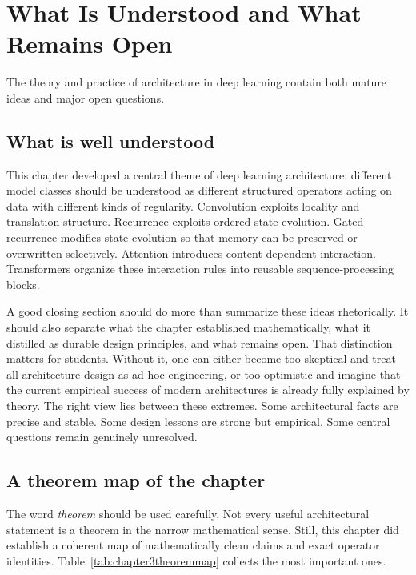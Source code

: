 \section{What Is Understood and What Remains Open}

The theory and practice of architecture in deep learning contain both mature ideas and major open questions.

\subsection*{What is well understood}

This chapter developed a central theme of deep learning architecture:
different model classes should be understood as different structured operators acting on data with different kinds of regularity.
Convolution exploits locality and translation structure.
Recurrence exploits ordered state evolution.
Gated recurrence modifies state evolution so that memory can be preserved or overwritten selectively.
Attention introduces content-dependent interaction.
Transformers organize these interaction rules into reusable sequence-processing blocks.

\medskip

A good closing section should do more than summarize these ideas rhetorically.
It should also separate what the chapter established mathematically, what it distilled as durable design principles, and what remains open.
That distinction matters for students.
Without it, one can either become too skeptical and treat all architecture design as ad hoc engineering, or too optimistic and imagine that the current empirical success of modern architectures is already fully explained by theory.
The right view lies between these extremes.
Some architectural facts are precise and stable.
Some design lessons are strong but empirical.
Some central questions remain genuinely unresolved.

\subsection*{A theorem map of the chapter}

The word \emph{theorem} should be used carefully.
Not every useful architectural statement is a theorem in the narrow mathematical sense.
Still, this chapter did establish a coherent map of mathematically clean claims and exact operator identities.
Table~\ref{tab:chapter3theoremmap} collects the most important ones.

